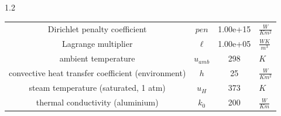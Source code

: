 \documentclass[preview]{standalone}
\begin{document}
\begin{spacing}{1.2}
\begin{tabular}{cccl}
\toprule
Dirichlet penalty coefficient & $pen$ & 1.00e+15 & $\frac{W}{K m^2}$ \\ 
Lagrange multiplier & $\ell$ & 1.00e+05 & $\frac{W K}{m^3}$ \\ 
ambient temperature & $u_{amb}$ & 298 & $K$ \\ 
convective heat transfer coefficient (environment) & $h$ & 25 & $\frac{W}{K m^2}$ \\ 
steam temperature (saturated, 1 atm) & $u_{H}$ & 373 & $K$ \\ 
thermal conductivity (aluminium) & $k_{0}$ & 200 & $\frac{W}{K m}$ \\ 
\bottomrule
\end{tabular}
\end{spacing}
\end{document}
